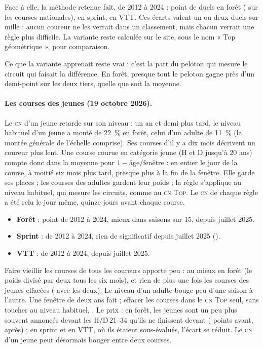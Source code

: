 \documentclass[11pt,a4paper]{article}
\newcommand{\Top}{\textsc{Top}}
\newcommand{\CN}{\textsc{cn}}
\begin{document}
Face à elle, la méthode retenue fait, de 2012 à 2024 : \NgeoF{} point de duels en forêt (\NgeoNF{} sur les courses nationales), \NgeoS{} en sprint, \NgeoVTT{} en VTT. Ces écarts valent un ou deux duels sur mille : aucun coureur ne les verrait dans un classement, mais chacun verrait une règle plus difficile. La variante reste calculée sur le site, sous le nom « Top géométrique », pour comparaison.

Ce que la variante apprenait reste vrai : c'est la part du peloton qui mesure le circuit qui faisait la différence. En forêt, presque tout le peloton gagne près d'un demi-point sur les deux tiers, quelle que soit la moyenne.

\paragraph{Les courses des jeunes (19 octobre 2026).} Le \CN{} d'un jeune retarde sur son niveau : un an et demi plus tard, le niveau habituel d'un jeune a monté de 22~\% en forêt, celui d'un adulte de 11~\% (la montée générale de l'échelle comprise). Ses courses d'il y a dix mois décrivent un coureur plus lent. Une course courue en catégorie jeune (H et D jusqu'à 20 ans) compte donc dans la moyenne pour $1 - \text{âge} / \text{fenêtre}$ : en entier le jour de la course, à moitié six mois plus tard, presque plus à la fin de la fenêtre. Elle garde ses places ; les courses des adultes gardent leur poids ; la règle s'applique au niveau habituel, qui mesure les circuits, comme au \CN{} \Top. Le \CN{} de chaque règle a été relu le jour même, quinze jours avant chaque course.
\begin{itemize}
  \item \textbf{Forêt} : \NjunF{} point de 2012 à 2024, mieux dans \NjunFBetter{} saisons sur 15, \NjunFT{} depuis juillet 2025.
  \item \textbf{Sprint} : \NjunS{} de 2012 à 2024, rien de significatif depuis juillet 2025 (\NjunST).
  \item \textbf{VTT} : \NjunV{} de 2012 à 2024, \NjunVT{} depuis juillet 2025.
\end{itemize}
Faire vieillir les courses de tous les coureurs apporte peu : au mieux \NjunAdult{} en forêt (le poids divisé par deux tous les six mois), et rien de plus une fois les courses des jeunes effacées (\NjunBoth{} avec les deux). Le niveau d'un adulte bouge peu d'une saison à l'autre. Une fenêtre de deux ans fait \NjunWin{} ; effacer les courses dans le \CN{} \Top{} seul, sans toucher au niveau habituel, \NjunTop. Le prix : en forêt, les jeunes sont un peu plus souvent annoncés devant les H/D\,21--34 qu'ils ne finissent devant (\NjunBiasBefore{} points avant, \NjunBiasAfter{} après) ; en sprint et en VTT, où ils étaient sous-évalués, l'écart se réduit. Le \CN{} d'un jeune peut désormais bouger entre deux courses.
\end{document}
